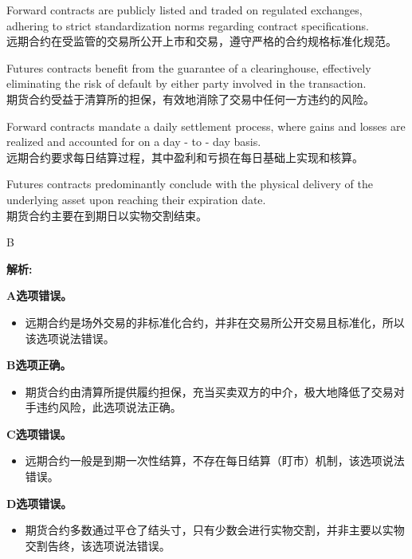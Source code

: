 \documentclass{article}
\newenvironment{explanation}
{\textbf{解析:}\par}
{\par}
\begin{document}
    \begin{choices}
        \item Forward contracts are publicly listed and traded on regulated exchanges, adhering to strict standardization norms regarding contract specifications.\\
        远期合约在受监管的交易所公开上市和交易，遵守严格的合约规格标准化规范。
        \item Futures contracts benefit from the guarantee of a clearinghouse, effectively eliminating the risk of default by either party involved in the transaction.\\
        期货合约受益于清算所的担保，有效地消除了交易中任何一方违约的风险。
        \item Forward contracts mandate a daily settlement process, where gains and losses are realized and accounted for on a day - to - day basis.\\
        远期合约要求每日结算过程，其中盈利和亏损在每日基础上实现和核算。
        \item Futures contracts predominantly conclude with the physical delivery of the underlying asset upon reaching their expiration date.\\
        期货合约主要在到期日以实物交割结束。
    \end{choices}
    
    \begin{correctanswer}
    B
    \end{correctanswer}
    
    \begin{explanation}
    \textbf{A选项错误。}
    \begin{itemize}
    \item 远期合约是场外交易的非标准化合约，并非在交易所公开交易且标准化，所以该选项说法错误。
    \end{itemize}
    \textbf{B选项正确。}
    \begin{itemize}
    \item 期货合约由清算所提供履约担保，充当买卖双方的中介，极大地降低了交易对手违约风险，此选项说法正确。
    \end{itemize}
    \textbf{C选项错误。}
    \begin{itemize}
    \item 远期合约一般是到期一次性结算，不存在每日结算（盯市）机制，该选项说法错误。
    \end{itemize}
    \textbf{D选项错误。}
    \begin{itemize}
    \item 期货合约多数通过平仓了结头寸，只有少数会进行实物交割，并非主要以实物交割告终，该选项说法错误。
    \end{itemize}
    \end{explanation}
    
\end{document}
